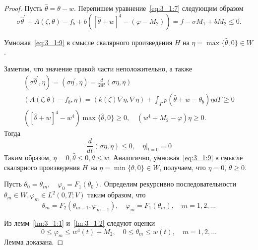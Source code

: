 \begin{proof}
    Пусть $\widehat{\theta}=\theta-w$.
    Перепишем уравнение~\eqref{eq:3_1:7} следующим образом
    \begin{equation}
        \label{eq:3_1:9}
        \sigma \widehat{\theta}^{\prime}+A(\zeta, \theta)-f_{b} +b\left([\widehat{\theta}
        +w]^{4}-\left(\varphi-M_{2}\right)\right)=f-\sigma M_{1}+b M_{2} \leq 0.
    \end{equation}

    Умножая~\eqref{eq:3_1:9} в смысле скалярного
    произведения $H$ на $\eta=\max \{\widehat{\theta}, 0\} \in W$.

    Заметим, что значение правой части неположительно, а также
    \[
        \begin{gathered}
            \left(\sigma \widehat{\theta}^{\prime}, \eta\right)=
            \left(\sigma \eta^{\prime}, \eta\right)=\frac{d}{2 d t}(\sigma \eta, \eta) \\
            \left(A(\zeta, \theta)-f_{b}, \eta\right)=(k(\zeta) \nabla \eta, \nabla \eta)
            + \int_{\Gamma} p\left(\widehat{\theta}+w-\theta_{b}\right) \eta d \Gamma \geq 0 \\
            \left([\widehat{\theta}+w]^{4}-w^{4}\right) \max
            \{\widehat{\theta}, 0\} \geq 0, \quad\left(w^{4}
            + M_{2} - \varphi\right) \eta \geq 0.
        \end{gathered}
    \]
    Тогда
    \[ \frac{d}{d t}(\sigma \eta, \eta) \leq 0,\left.\quad \eta\right|_{t=0}=0 \]
    Таким образом, $\eta=0, \widehat{\theta} \leq 0, \theta \leq w$.
    Аналогично, умножая~\eqref{eq:3_1:9} в смысле скалярного произведения
    $H$ на $\eta=\min \{\theta, 0\} \in W$, получаем, что $\eta=0,\, \theta \geq 0$.

    Пусть $\theta_{0}=\theta_{i n}, \quad \varphi_{0}=F_{1}\left(\theta_{0}\right)$.
    Определим рекурсивно последовательности
    $\theta_{m} \in W, \varphi_{m} \in L^{2}(0, T ; V)$ таким образом, что
    \begin{equation}
        \label{eq:3_1:10}
        \theta_{m}=F_{2}\left(\theta_{m-1}, \varphi_{m-1}\right),
        \quad \varphi_{m}=F_{1}\left(\theta_{m}\right), \quad m=1,2, \ldots
    \end{equation}


    Из лемм~\ref{lm:3_1:1} и~\ref{lm:3_1:2} следуют оценки
    \begin{equation}
        \label{eq:3_1:11}
        0 \leq \varphi_{m} \leq w^{4}(t)+M_{2},
        \quad 0 \leq \theta_{m} \leq w(t), \quad m=1,2, \ldots
    \end{equation}
    Лемма доказана.
\end{proof}
